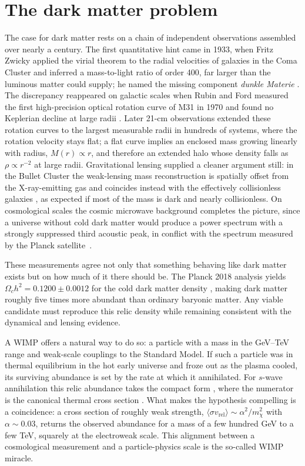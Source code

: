 \section*{The dark matter problem}
The case for dark matter rests on a chain of independent observations assembled over nearly a century. The first quantitative hint came in 1933, when Fritz Zwicky applied the virial theorem to the radial velocities of galaxies in the Coma Cluster and inferred a mass-to-light ratio of order 400, far larger than the luminous matter could supply; he named the missing component \emph{dunkle Materie} \cite{Zwicky:1933}. The discrepancy reappeared on galactic scales when Rubin and Ford measured the first high-precision optical rotation curve of M31 in 1970 and found no Keplerian decline at large radii \cite{Rubin:1970zza}. Later 21-cm observations extended these rotation curves to the largest measurable radii in hundreds of systems, where the rotation velocity stays flat; a flat curve implies an enclosed mass growing linearly with radius, $M(r) \propto r$, and therefore an extended halo whose density falls as $\rho \propto r^{-2}$ at large radii. Gravitational lensing supplied a cleaner argument still: in the Bullet Cluster the weak-lensing mass reconstruction is spatially offset from the X-ray-emitting gas and coincides instead with the effectively collisionless galaxies \cite{Clowe:2006eq}, as expected if most of the mass is dark and nearly collisionless. On cosmological scales the cosmic microwave background completes the picture, since a universe without cold dark matter would produce a power spectrum with a strongly suppressed third acoustic peak, in conflict with the spectrum measured by the Planck satellite~\cite{Aghanim:2018eyx}.

These measurements agree not only that something behaving like dark matter exists but on how much of it there should be. The Planck 2018 analysis yields $\Omega_c h^2 = 0.1200 \pm 0.0012$ for the cold dark matter density \cite{Aghanim:2018eyx}, making dark matter roughly five times more abundant than ordinary baryonic matter. Any viable candidate must reproduce this relic density while remaining consistent with the dynamical and lensing evidence.

A WIMP offers a natural way to do so: a particle with a mass in the GeV--TeV range and weak-scale couplings to the Standard Model. If such a particle was in thermal equilibrium in the hot early universe and froze out as the plasma cooled, its surviving abundance is set by the rate at which it annihilated. For $s$-wave annihilation this relic abundance takes the compact form
\be
{} \approx {},
\ee
where the numerator is the canonical thermal cross section \cite{Steigman:2012nb, Cirelli:2024ssz}. What makes the hypothesis compelling is a coincidence: a cross section of roughly weak strength, $\langle \sigma v_\mathrm{rel}\rangle \sim \alpha^2/m_\chi^2$ with $\alpha \sim 0.03$, returns the observed abundance for a mass of a few hundred GeV to a few TeV, squarely at the electroweak scale. This alignment between a cosmological measurement and a particle-physics scale is the so-called WIMP miracle.

